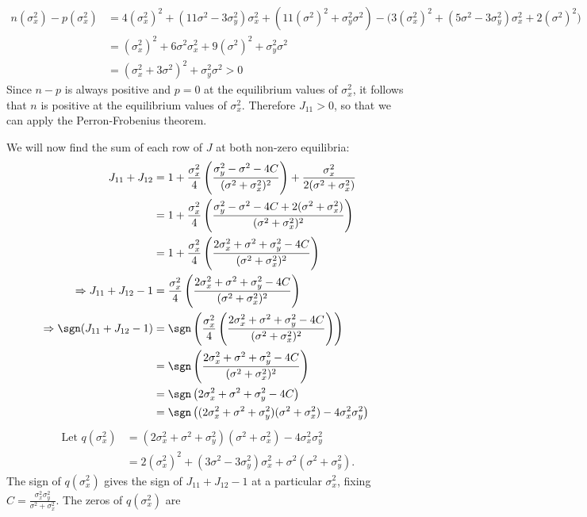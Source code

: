 \documentclass{article}
\begin{document}
\begin{enumerate}
\begin{align*}
n(\sigma_x^2)-p(\sigma_x^2)&=4(\sigma_x^2)^2+(11\sigma^2-3\sigma_y^2)\sigma_x^2+(11(\sigma^2)^2+\sigma_y^2\sigma^2)-\big(3(\sigma_x^2)^2+(5\sigma^2-3\sigma_y^2)\sigma_x^2+2(\sigma^2)^2\big)
\\&=(\sigma_x^2)^2+6\sigma^2\sigma_x^2+9(\sigma^2)^2+\sigma_y^2\sigma^2
\\&=(\sigma_x^2+3\sigma^2)^2+\sigma_y^2\sigma^2>0
\end{align*}
Since $n-p$ is always positive and $p=0$ at the equilibrium values of $\sigma_x^2$, it follows that $n$ is positive at the equilibrium values of $\sigma_x^2$. Therefore $J_{11}>0$, so that we can apply the Perron-Frobenius theorem.

We will now find the sum of each row of $J$ at both non-zero equilibria: 
\begin{align*}
J_{11}+J_{12}&=1 + \frac{\sigma_x^2}{4}\left(\frac{\sigma_y^2-\sigma^2-4C}{(\sigma^2+\sigma_x^2)^2}\right)+\frac{\sigma_x^2}{2(\sigma^2+\sigma_x^2)}
\\&=1 + \frac{\sigma_x^2}{4}\left(\frac{\sigma_y^2-\sigma^2-4C+2(\sigma^2+\sigma_x^2)}{(\sigma^2+\sigma_x^2)^2}\right)
\\&=1 + \frac{\sigma_x^2}{4}\left(\frac{2\sigma_x^2+\sigma^2+\sigma_y^2-4C}{(\sigma^2+\sigma_x^2)^2}\right)
\\ \Rightarrow J_{11}+J_{12}-1&=\frac{\sigma_x^2}{4}\left(\frac{2\sigma_x^2+\sigma^2+\sigma_y^2-4C}{(\sigma^2+\sigma_x^2)^2}\right)
\\ \Rightarrow \sgn(J_{11}+J_{12}-1)&=\sgn\left(\frac{\sigma_x^2}{4}\left(\frac{2\sigma_x^2+\sigma^2+\sigma_y^2-4C}{(\sigma^2+\sigma_x^2)^2}\right)\right)
\\&=\sgn\left(\frac{2\sigma_x^2+\sigma^2+\sigma_y^2-4C}{(\sigma^2+\sigma_x^2)^2}\right)
\\&=\sgn\left(2\sigma_x^2+\sigma^2+\sigma_y^2-4C\right)
\\&=\sgn\left((2\sigma_x^2+\sigma^2+\sigma_y^2)(\sigma^2+\sigma_x^2)-4\sigma_x^2\sigma_y^2\right)
\end{align*}
\begin{align*}
\text{ Let } q(\sigma_x^2)&=(2\sigma_x^2+\sigma^2+\sigma_y^2)(\sigma^2+\sigma_x^2)-4\sigma_x^2\sigma_y^2
\\&=2(\sigma_x^2)^2+(3\sigma^2-3\sigma_y^2)\sigma_x^2+\sigma^2(\sigma^2+\sigma_y^2).
\end{align*}
The sign of $q(\sigma_x^2)$ gives the sign of $J_{11}+J_{12}-1$ at a particular $\sigma_x^2$, fixing $C=\frac{\sigma_x^2\sigma_y^2}{\sigma^2+\sigma_x^2}$. The zeros of $q(\sigma_x^2)$ are 

\end{enumerate}
\end{document}
